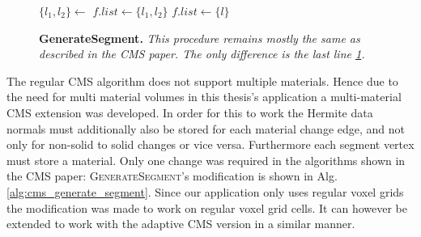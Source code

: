 \begin{wrapfigure}{R}{0.45\textwidth}
\begin{minipage}{0.45\textwidth}
\begin{algorithm}[H]
\caption{\textbf{GenerateSegment.} \textit{This procedure remains mostly the same as described in the CMS paper. The only difference is the last line \ref{algstatement:cms_generate_segment_change}.}}\label{alg:cms_generate_segment}
\begin{algorithmic}[1]
		\State $\{l_1, l_2\} \gets $
		\State $f.list \gets \{l_1, l_2\}$
		\State {}
		\State $f.list \gets \{l\}$
		\State {}
	\EndIf
	\State {} \label{algstatement:cms_generate_segment_change}
\EndProcedure
\end{algorithmic}
\end{algorithm}
\end{minipage}
\end{wrapfigure}

The regular CMS algorithm does not support multiple materials. Hence due to the need for multi material volumes in this thesis's application
a multi-material CMS extension was developed. In order for this to work the Hermite data normals must additionally also be stored for each material change edge, and not only for non-solid
to solid changes or vice versa. Furthermore each segment vertex must store a material.
Only one change was required in the algorithms shown in the CMS paper: \textsc{GenerateSegment}'s modification is shown in Alg. \ref{alg:cms_generate_segment}.
Since our application only uses regular voxel grids the modification was made to work on regular voxel grid cells. It can however be extended to work with the adaptive CMS version
in a similar manner.


